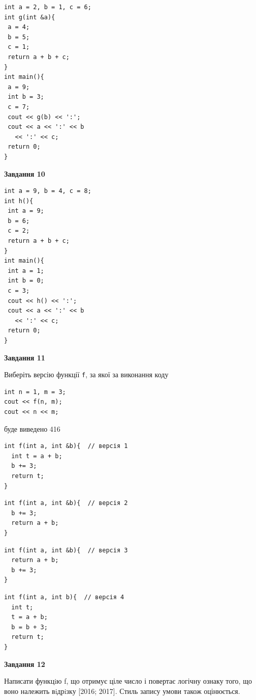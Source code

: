 \documentclass[12pt, ukrainian]{article}
\def\code#1{\Verb!#1!}
\begin{document}
{\begin {large}
\begin{minipage}[t]{7.0cm}
\begin{verbatim}
int a = 2, b = 1, c = 6;
int g(int &a){
 a = 4;
 b = 5;
 c = 1;
 return a + b + c;
}
int main(){
 a = 9;
 int b = 3;
 c = 7;
 cout << g(b) << ':';
 cout << a << ':' << b 
   << ':' << c;
 return 0;
}
\end{verbatim}



\begin{center}
\textbf{Завдання 10}
\end{center}
\vspace{-8mm}

\begin{verbatim}
int a = 9, b = 4, c = 8;
int h(){
 int a = 9;
 b = 6;
 c = 2;
 return a + b + c;
}
int main(){
 int a = 1;
 int b = 0;
 c = 3;
 cout << h() << ':';
 cout << a << ':' << b 
   << ':' << c;
 return 0;
}
\end{verbatim}

\end{minipage}
\vline \hspace{1mm}
\begin{minipage}[t]{11.0cm}

\begin{center}
\textbf{Завдання 11}
\end{center}
Виберіть версію функції \code{f}, за якої за виконання коду
\begin{verbatim}
int n = 1, m = 3;
cout << f(n, m);
cout << n << m;
\end{verbatim}

буде виведено 416

\begin{verbatim}
int f(int a, int &b){  // версія 1
  int t = a + b;
  b += 3;
  return t;
}
\end{verbatim}

\vspace{-8mm}\begin{verbatim}
int f(int a, int &b){  // версія 2
  b += 3;
  return a + b;
}
\end{verbatim}

\vspace{-8mm}\begin{verbatim}
int f(int a, int &b){  // версія 3
  return a + b;
  b += 3;
}
\end{verbatim}

\vspace{-8mm}\begin{verbatim}
int f(int a, int b){  // версія 4
  int t;
  t = a + b;
  b = b + 3;
  return t;
}
\end{verbatim}



\begin{center}
\textbf{Завдання 12}
\end{center}

Написати функцiю f, що отримує ціле число і повертає логічну ознаку того, що воно належить вiдрiзку [2016; 2017]. Стиль запису умови також оцінюється.\par

\end{minipage}

\end {large}}
\newpage
\end{document}
